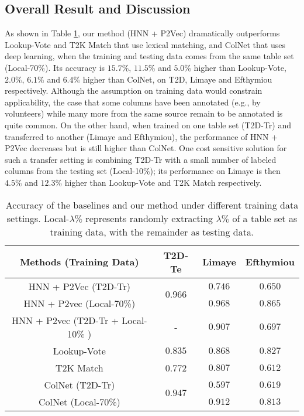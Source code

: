 \documentclass{article}
\begin{document}
\subsection{Overall Result and Discussion}
As shown in Table \ref{res:baseline}, 
our method (HNN + P2Vec) dramatically outperforms Lookup-Vote and T2K Match that use lexical matching, and ColNet that uses deep learning,
when the training and testing data comes from the same table set (Local-70\%).
Its accuracy is $15.7\%$, $11.5\%$ and $5.0\%$ higher than Lookup-Vote,
$2.0\%$, $6.1\%$ and $6.4\%$ higher than ColNet,
on T2D, Limaye and Efthymiou respectively.
Although the assumption on training data would constrain applicability, 
the case that some columns have been annotated (e.g., by volunteers) while many more from the same source remain to be annotated is quite common.
On the other hand, when  trained on one table set (T2D-Tr) and transferred to another (Limaye and Efthymiou), the performance of HNN + P2Vec decreases but is still higher than ColNet. 
One cost sensitive solution for such a transfer setting is combining T2D-Tr with a small number of labeled columns from the testing set (Local-10\%);
its performance on Limaye is then $4.5\%$ and $12.3\%$ higher than Lookup-Vote and T2K Match respectively.

\vspace{-0.2cm}
\begin{table}[h!]
\scriptsize{
\centering
\begin{tabular}[t]{c|c|c|c}
\hline
Methods (Training Data) & T2D-Te & Limaye & Efthymiou    \\\hline 
 HNN + P2Vec (T2D-Tr) &\multirow{2}{*}{$\bm{0.966}$} &$0.746$ &$0.650$  \\
 HNN + P2vec (Local-70\%)   &  &$\bm{0.968}$& $\bm{0.865}$  \\
 HNN + P2vec (T2D-Tr + Local-10\% )    & - & $0.907$ & $0.697$  \\\hline
 Lookup-Vote  &$0.835$ &$0.868$ &$0.827$  \\
 T2K Match & 0$.772$ & $0.807$ & $0.612$   \\\hline
 ColNet (T2D-Tr) & \multirow{2}{*}{$0.947$} & $0.597$ & $0.619$   \\
 ColNet (Local-70\%) &  & $0.912$ & $0.813$   \\\hline
\end{tabular}
\vspace{-0.2cm}
\caption{\footnotesize
Accuracy of the baselines and our method under different training data settings. 
Local-$\lambda\%$ represents
randomly extracting $\lambda\%$ of a table set as training data, with the remainder as testing data. 
}\label{res:baseline}
}
\end{table}
\vspace{-0.1cm}
\end{document}
